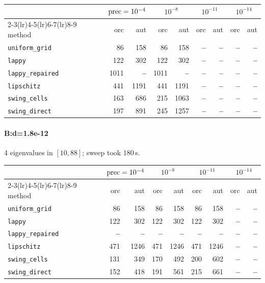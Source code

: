 \begin{center}
\small
\begin{tabular}{lrrrrrrrr}
\toprule
& \multicolumn{2}{c}{$\mathrm{prec}=10^{-4}$} & \multicolumn{2}{c}{$10^{-8}$} & \multicolumn{2}{c}{$10^{-11}$} & \multicolumn{2}{c}{$10^{-14}$} \\
\cmidrule(lr){2-3}\cmidrule(lr){4-5}\cmidrule(lr){6-7}\cmidrule(lr){8-9}
method & orc & aut & orc & aut & orc & aut & orc & aut \\
\midrule
\texttt{uniform\_grid} & 86 & 158 & 86 & 158 & \textbf{--} & \textbf{--} & \textbf{--} & \textbf{--} \\
\texttt{lappy} & 122 & 302 & 122 & 302 & \textbf{--} & \textbf{--} & \textbf{--} & \textbf{--} \\
\texttt{lappy\_repaired} & 1011 & \textbf{--} & 1011 & \textbf{--} & \textbf{--} & \textbf{--} & \textbf{--} & \textbf{--} \\
\texttt{lipschitz} & 441 & 1191 & 441 & 1191 & \textbf{--} & \textbf{--} & \textbf{--} & \textbf{--} \\
\texttt{swing\_cells} & 163 & 686 & 215 & 1063 & \textbf{--} & \textbf{--} & \textbf{--} & \textbf{--} \\
\texttt{swing\_direct} & 197 & 891 & 245 & 1257 & \textbf{--} & \textbf{--} & \textbf{--} & \textbf{--} \\
\bottomrule
\end{tabular}
\end{center}

\paragraph{B:d=1.8e-12} 4 eigenvalues in $[10, 88]$; sweep took 180\,s.

\begin{center}
\small
\begin{tabular}{lrrrrrrrr}
\toprule
& \multicolumn{2}{c}{$\mathrm{prec}=10^{-4}$} & \multicolumn{2}{c}{$10^{-8}$} & \multicolumn{2}{c}{$10^{-11}$} & \multicolumn{2}{c}{$10^{-14}$} \\
\cmidrule(lr){2-3}\cmidrule(lr){4-5}\cmidrule(lr){6-7}\cmidrule(lr){8-9}
method & orc & aut & orc & aut & orc & aut & orc & aut \\
\midrule
\texttt{uniform\_grid} & 86 & 158 & 86 & 158 & 86 & 158 & \textbf{--} & \textbf{--} \\
\texttt{lappy} & 122 & 302 & 122 & 302 & 122 & 302 & \textbf{--} & \textbf{--} \\
\texttt{lappy\_repaired} & \textbf{--} & \textbf{--} & \textbf{--} & \textbf{--} & \textbf{--} & \textbf{--} & \textbf{--} & \textbf{--} \\
\texttt{lipschitz} & 471 & 1246 & 471 & 1246 & 471 & 1246 & \textbf{--} & \textbf{--} \\
\texttt{swing\_cells} & 131 & 349 & 170 & 492 & 200 & 602 & \textbf{--} & \textbf{--} \\
\texttt{swing\_direct} & 152 & 418 & 191 & 561 & 215 & 661 & \textbf{--} & \textbf{--} \\
\bottomrule
\end{tabular}
\end{center}

